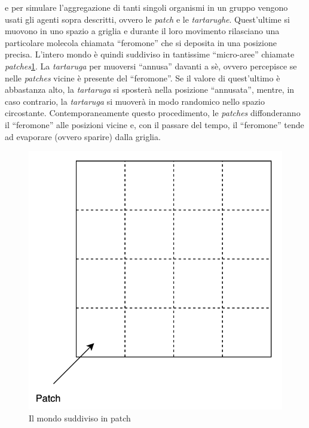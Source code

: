 e per simulare l'aggregazione di tanti singoli organismi in un gruppo vengono usati gli agenti sopra descritti, 
ovvero le \textit{patch} e le \textit{tartarughe}.
Quest'ultime si muovono in uno spazio a griglia e durante il loro movimento rilasciano una particolare molecola
chiamata ``feromone'' che si deposita in una posizione precisa. L'intero mondo è quindi suddiviso
in tantissime ``micro-aree'' chiamate \textit{patches}\space\cref{fig:patch}. La \textit{tartaruga} per muoversi 
``annusa'' davanti a sè, ovvero percepisce se nelle \textit{patches} vicine è presente del ``feromone''. Se il valore di quest'ultimo è abbastanza alto, la 
\textit{tartaruga} si sposterà nella posizione ``annusata'', mentre, in caso contrario, la \textit{tartaruga} si muoverà in modo randomico nello spazio circostante. 
Contemporaneamente questo procedimento, le \textit{patches} diffonderanno il ``feromone'' alle posizioni vicine e, con il passare del tempo,
il ``feromone'' tende ad evaporare (ovvero sparire) dalla griglia.

\begin{figure}[ht]
    \centering
    \includegraphics[scale=0.6]{figures/patch.png}
    \caption{Il mondo suddiviso in patch}\label{fig:patch}
\end{figure}

